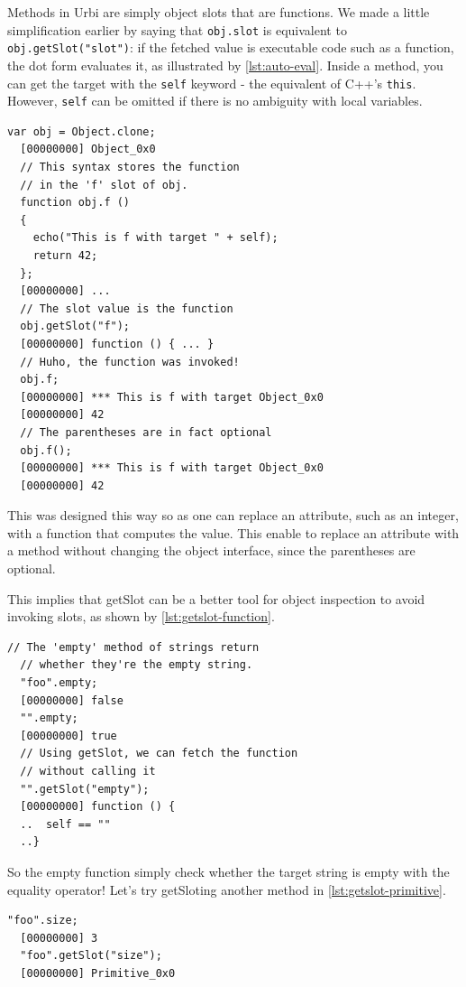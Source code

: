 \documentclass[openright,twoside,12pt]{report}
\newcommand{\Cxx}{C++\xspace}
\newcommand{\urbi}{Urbi\xspace}
\newcommand{\lst}[1]{\autoref{lst:#1}}
\begin{document}
Methods in \urbi are simply object slots that are functions. We made a
little simplification earlier by saying that \lstinline|obj.slot| is
equivalent to \lstinline|obj.getSlot("slot")|: if the fetched value is
executable code such as a function, the dot form evaluates it, as
illustrated by \lst{auto-eval}. Inside a method, you can get the
target with the \lstinline|self| keyword - the equivalent of \Cxx's
\texttt{this}. However, \lstinline|self| can be omitted if there is no
ambiguity with local variables.

\begin{lstlisting}[caption=Function in object are automatically evaluated,
  label=lst:auto-eval]
  var obj = Object.clone;
  [00000000] Object_0x0
  // This syntax stores the function
  // in the 'f' slot of obj.
  function obj.f ()
  {
    echo("This is f with target " + self);
    return 42;
  };
  [00000000] ...
  // The slot value is the function
  obj.getSlot("f");
  [00000000] function () { ... }
  // Huho, the function was invoked!
  obj.f;
  [00000000] *** This is f with target Object_0x0
  [00000000] 42
  // The parentheses are in fact optional
  obj.f();
  [00000000] *** This is f with target Object_0x0
  [00000000] 42
\end{lstlisting}

This was designed this way so as one can replace an attribute, such as
an integer, with a function that computes the value. This enable to
replace an attribute with a method without changing the object
interface, since the parentheses are optional.

This implies that getSlot can be a better tool for object inspection
to avoid invoking slots, as shown by \lst{getslot-function}.

\begin{lstlisting}[caption=Inspecting executable slots with \texttt{getSlot},
  label=lst:getslot-function]
  // The 'empty' method of strings return
  // whether they're the empty string.
  "foo".empty;
  [00000000] false
  "".empty;
  [00000000] true
  // Using getSlot, we can fetch the function
  // without calling it
  "".getSlot("empty");
  [00000000] function () {
  ..  self == ""
  ..}
\end{lstlisting}

So the empty function simply check whether the target string is empty
with the equality operator! Let's try getSloting another method in
\lst{getslot-primitive}.

\begin{lstlisting}[caption=Primitives, label=lst:getslot-primitive]
  "foo".size;
  [00000000] 3
  "foo".getSlot("size");
  [00000000] Primitive_0x0
\end{lstlisting}
\end{document}
